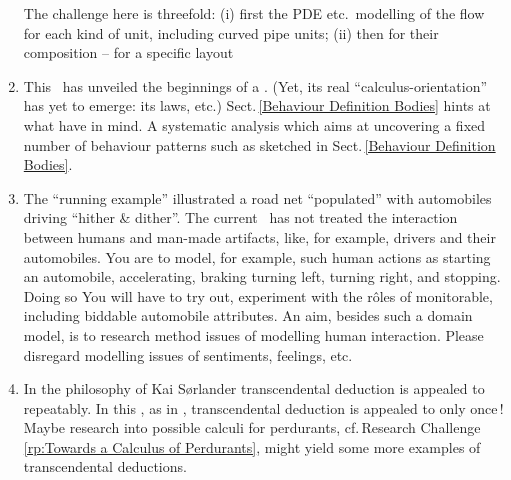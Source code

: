 \begin{enumerate}
      The challenge here is threefold: (i) first the PDE etc.\ modelling of
      the flow for each kind of unit, including curved pipe
      units;  (ii) then for their composition -- for a specific layout 
\mnewfoil
\item \label{rp:Towards a Calculus of Perdurants}   This \primer\ has 
      unveiled the beginnings of a . (Yet, its
      real ``calculus-orientation'' has yet to emerge: its laws, etc.)
      Sect.\,\ref{Behaviour Definition Bodies}  hints at what
       have in
      mind. A systematic analysis which aims at uncovering a fixed number
      of behaviour patterns such as sketched in Sect.\,\ref{Behaviour Definition Bodies}. 
\mnewfoil
\item \label{rp:Human Interaction}   The ``running example'' illustrated a
      road net ``populated'' with automobiles driving ``hither \&
      dither''. The current \primer\ has not treated the interaction
      between humans and man-made artifacts, like, for example,
      drivers and their automobiles. You are to model, for example,
      such human actions as starting an automobile, accelerating,
      braking\ysfchg{, } turning left, turning right, and stopping. Doing so
      You will have to try out, experiment with the r{\^{o}}les of
      monitorable, including biddable automobile attributes. An aim,
      besides such a domain model, is to research method issues of
      modelling human interaction. Please disregard modelling issues
      of sentiments, feelings, etc. 
\mnewfoil
\item \label{rp:Transcendental Deduction}   In the philosophy of Kai 
      S{\o}rlander  transcendental deduction is
      appealed to repeatably. In this \primer, as in
      \cite{BjornerMonograph2020}, transcendental deduction is
      appealed to only once\,! Maybe research into possible calculi
      for perdurants, cf.\,\textsf{Research Challenge}\,\ref{rp:Towards
      a Calculus of Perdurants}, might yield some more examples of transcendental deductions. 

\end{enumerate}
